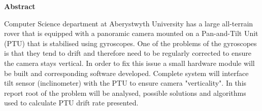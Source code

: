 \thispagestyle{empty}

\begin{center}
    {\LARGE\bf Abstract}
\end{center}

Computer Science department at Aberystwyth University has a large all-terrain rover that is equipped with a panoramic camera mounted on a Pan-and-Tilt Unit (PTU) that is stabilised using gyroscopes. One of the problems of the gyroscopes is that they tend to drift and therefore need to be regularly corrected to ensure the camera stays vertical. In order to fix this issue a small hardware module will be built and corresponding software developed. Complete system will interface tilt sensor (inclinometer) with the PTU to ensure camera "verticality". In this report root of the problem will be analysed, possible solutions and algorithms used to calculate PTU drift rate presented. 